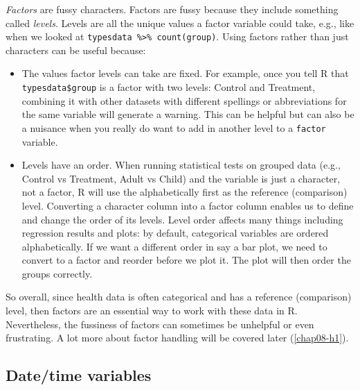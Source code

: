 \documentclass[
  12pt,
  krantz2]{krantz}
\providecommand{\tightlist}{%
  \setlength{\itemsep}{0pt}\setlength{\parskip}{0pt}}
\begin{document}

\emph{Factors} are fussy characters.
Factors are fussy because they include something called \emph{levels}.
Levels are all the unique values a factor variable could take, e.g., like when we looked at \texttt{typesdata\ \%\textgreater{}\%\ count(group)}.
Using factors rather than just characters can be useful because:

\begin{itemize}
\tightlist
\item
  The values factor levels can take are fixed.
  For example, once you tell R that \texttt{typesdata\$group} is a factor with two levels: Control and Treatment, combining it with other datasets with different spellings or abbreviations for the same variable will generate a warning.
  This can be helpful but can also be a nuisance when you really do want to add in another level to a \texttt{factor} variable.
\item
  Levels have an order.
  When running statistical tests on grouped data (e.g., Control vs Treatment, Adult vs Child) and the variable is just a character, not a factor, R will use the alphabetically first as the reference (comparison) level.
  Converting a character column into a factor column enables us to define and change the order of its levels.
  Level order affects many things including regression results and plots: by default, categorical variables are ordered alphabetically.
  If we want a different order in say a bar plot, we need to convert to a factor and reorder before we plot it.
  The plot will then order the groups correctly.
\end{itemize}

So overall, since health data is often categorical and has a reference (comparison) level, then factors are an essential way to work with these data in R.
Nevertheless, the fussiness of factors can sometimes be unhelpful or even frustrating.
A lot more about factor handling will be covered later (\ref{chap08-h1}).

\hypertarget{datetime-variables}{%
\subsection{Date/time variables}\label{datetime-variables}}

\end{document}
